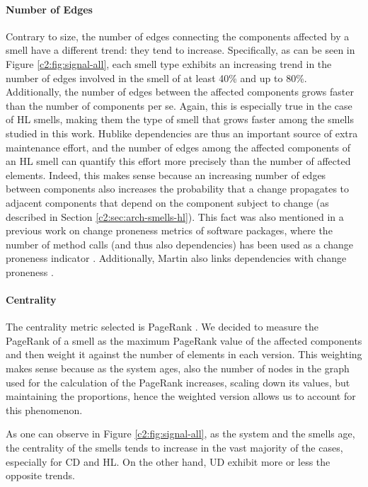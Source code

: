 \paragraph{Number of Edges}
Contrary to size, the number of edges connecting the components affected by a smell have a different trend: they tend to increase.
Specifically, as can be seen in Figure \ref{c2:fig:signal-all}, each smell type exhibits an increasing trend in the number of edges involved in the smell of at least 40\% and up to 80\%.
Additionally, the number of edges between the affected components grows faster than the number of components per se.
Again, this is especially true in the case of HL smells, making them the type of smell that grows faster among the smells studied in this work.
Hublike dependencies are thus an important source of extra maintenance effort, and the number of edges among the affected components of an HL smell can quantify this effort more precisely than the number of affected elements. 
Indeed, this makes sense because an increasing number of edges between components also increases the probability that a change propagates to adjacent components that depend on the component subject to change (as described in Section \ref{c2:sec:arch-smells-hl}).
This fact was also mentioned in a previous work on change proneness metrics of software packages, where the number of method calls (and thus also dependencies) has been used as a change proneness indicator \cite{Arvanitou2015}. Additionally, Martin also links dependencies with change proneness \cite{Martin2018}.

\paragraph{Centrality} 
The centrality metric selected is PageRank \cite{Roveda2018}. We decided to measure the PageRank of a smell as the maximum PageRank value of the affected components and then weight it against the number of elements in each version.
This weighting makes sense because as the system ages, also the number of nodes in the graph used for the calculation of the PageRank increases, scaling down its values, but maintaining the proportions, hence the weighted version allows us to account for this phenomenon.

As one can observe in Figure \ref{c2:fig:signal-all}, as the system and the smells age, the centrality of the smells tends to increase in the vast majority of the cases, especially for CD and HL. On the other hand, UD exhibit more or less the opposite trends.


